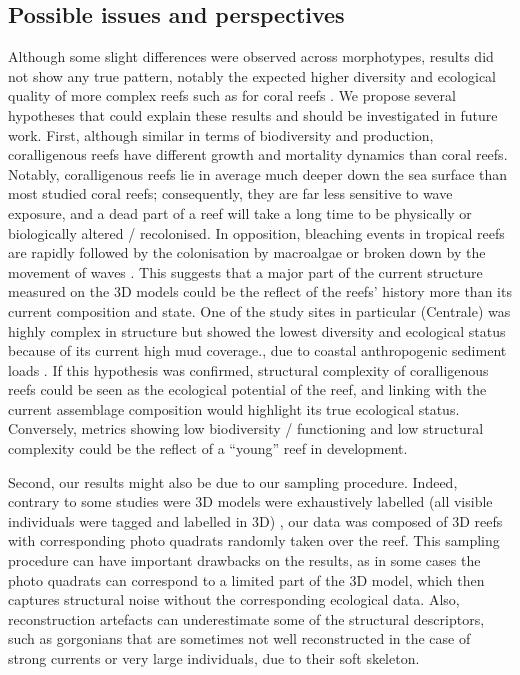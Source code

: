 \subsection{Possible issues and perspectives}\label{chapitre4_4.3}
Although some slight differences were observed across morphotypes, results did not show any true pattern, notably the expected higher diversity and ecological quality of more complex reefs such as for coral reefs \citep{darling_relationships_2017, price_using_2019}. We propose several hypotheses that could explain these results and should be investigated in future work. First, although similar in terms of biodiversity and production, coralligenous reefs have different growth and mortality dynamics than coral reefs. Notably, coralligenous reefs lie in average much deeper down the sea surface than most studied coral reefs; consequently, they are far less sensitive to wave exposure, and a dead part of a reef will take a long time to be physically or biologically altered / recolonised. In opposition, bleaching events in tropical reefs are rapidly followed by the colonisation by macroalgae or broken down by the movement of waves \citep{graham_predicting_2015}. This suggests that a major part of the current structure measured on the 3D models could be the reflect of the reefs’ history more than its current composition and state. One of the study sites in particular (Centrale) was highly complex in structure but showed the lowest diversity and ecological status because of its current high mud coverage., due to coastal anthropogenic sediment loads \citep{airoldi_effects_2003, ballesteros_mediterranean_2006}. If this hypothesis was confirmed, structural complexity of coralligenous reefs could be seen as the ecological potential of the reef, and linking with the current assemblage composition would highlight its true ecological status. Conversely, metrics showing low biodiversity / functioning and low structural complexity could be the reflect of a “young” reef in development.

Second, our results might also be due to our sampling procedure. Indeed, contrary to some studies were 3D models were exhaustively labelled (all visible individuals were tagged and labelled in 3D) \citep{price_using_2019}, our data was composed of 3D reefs with corresponding photo quadrats randomly taken over the reef. This sampling procedure can have important drawbacks on the results, as in some cases the photo quadrats can correspond to a limited part of the 3D model, which then captures structural noise without the corresponding ecological data. Also, reconstruction artefacts can underestimate some of the structural descriptors, such as gorgonians that are sometimes not well reconstructed in the case of strong currents or very large individuals, due to their soft skeleton.

